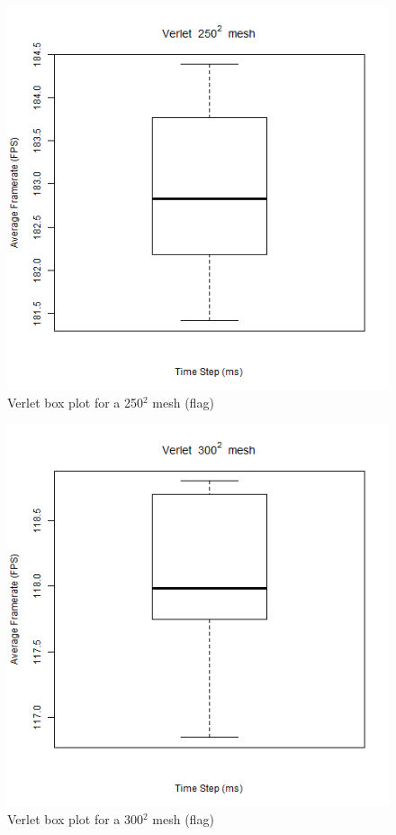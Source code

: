       \begin{figure}
    \begin{center}
      \includegraphics[scale=.9]{Figures/flag_v_250_box}
    \end{center}
    \caption{Verlet box plot for a 250$^{2}$ mesh (flag)}
    \label{fig:v box 250 flag}
  \end{figure}
  
      \begin{figure}
    \begin{center}
      \includegraphics[scale=.9]{Figures/flag_v_300_box}
    \end{center}
    \caption{Verlet box plot for a 300$^{2}$ mesh (flag)}
    \label{fig:v box 300 flag}
  \end{figure}

